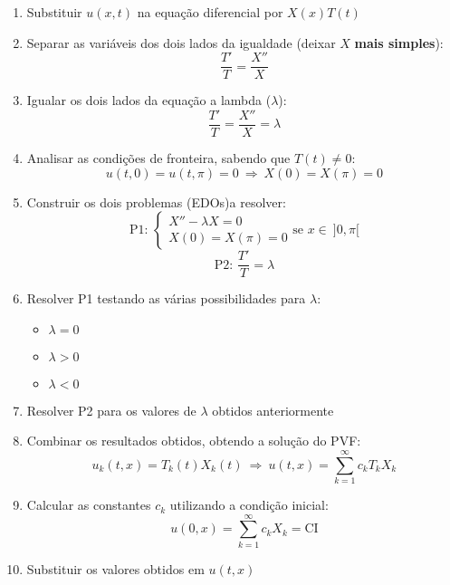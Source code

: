 \documentclass[11pt, a4paper]{article}
\begin{document}
\begin{enumerate}
    \item Substituir $u(x, t)$ na equação diferencial por $X(x)T(t)$
    \item Separar as variáveis dos dois lados da igualdade 
          (deixar $X$ \textbf{mais simples}):
          \begin{equation*}
              \frac{T'}{T} = \frac{X''}{X}
          \end{equation*}
    \item Igualar os dois lados da equação a lambda ($\lambda$):
          \begin{equation*}
              \frac{T'}{T} = \frac{X''}{X} = \lambda
          \end{equation*}
    \item Analisar as condições de fronteira, sabendo que $T(t) \neq 0$:
          \begin{equation*}
              u(t, 0) = u(t, \pi) = 0 \ \Rightarrow\ X(0) = X(\pi) = 0
          \end{equation*}
    \item Construir os dois problemas (EDOs)a resolver:
          \begin{equation*}
              \text{P1:\ \ \ }
              \begin{cases}
                  X'' - \lambda X = 0 \\
                  X(0) = X(\pi) = 0
              \end{cases}
              \text{se $x \in\ ]0, \pi[$}
          \end{equation*}
          \begin{equation*}
              \text{P2:\ \ \ } \frac{T'}{T} = \lambda
          \end{equation*}
    \item Resolver P1 testando as várias possibilidades para $\lambda$:
          \begin{itemize}
              \item $\lambda = 0$
              \item $\lambda > 0$
              \item $\lambda < 0$
          \end{itemize}
    \item Resolver P2 para os valores de $\lambda$ obtidos anteriormente
    \item Combinar os resultados obtidos, obtendo a solução do PVF:
          \begin{equation*}
              u_k(t, x) = T_k(t) X_k(t) \ \Rightarrow \
              u(t,x) = \sum_{k=1}^{\infty} c_k T_k X_k
          \end{equation*}
    \item Calcular as constantes $c_k$ utilizando a condição inicial:
          \begin{equation*}
              u(0,x) = \sum_{k=1}^{\infty} c_k X_k = \text{CI}
          \end{equation*}
    \item Substituir os valores obtidos em $u(t,x)$
\end{enumerate}
\end{document}
